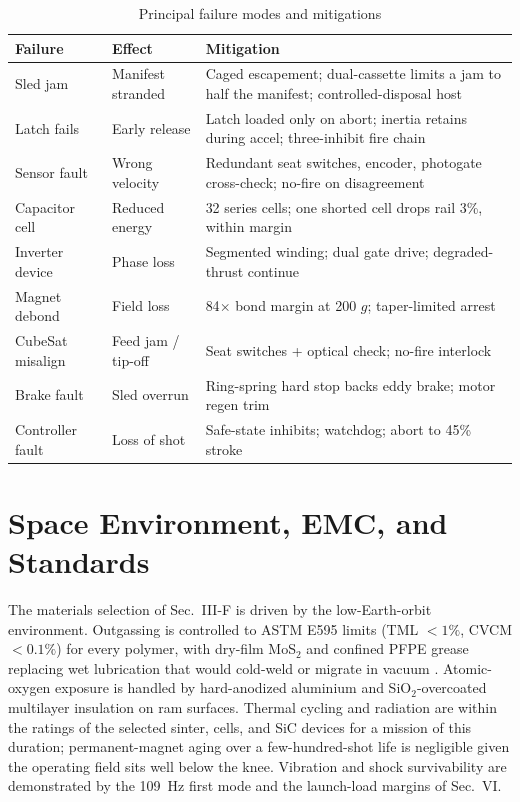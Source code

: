 \documentclass[conference]{IEEEtran}
\begin{document}
\begin{table}[t]
\caption{Principal failure modes and mitigations}
\label{tab:fmea}
\centering\footnotesize
\begin{tabular}{p{1.5cm}p{1.4cm}p{4.2cm}}
\toprule
Failure & Effect & Mitigation\\
\midrule
Sled jam & Manifest stranded & Caged escapement; dual-cassette limits a jam to half the manifest; controlled-disposal host\\
Latch fails & Early release & Latch loaded only on abort; inertia retains during accel; three-inhibit fire chain\\
Sensor fault & Wrong velocity & Redundant seat switches, encoder, photogate cross-check; no-fire on disagreement\\
Capacitor cell & Reduced energy & 32 series cells; one shorted cell drops rail 3\%, within margin\\
Inverter device & Phase loss & Segmented winding; dual gate drive; degraded-thrust continue\\
Magnet debond & Field loss & 84$\times$ bond margin at 200 $g$; taper-limited arrest\\
CubeSat misalign & Feed jam / tip-off & Seat switches + optical check; no-fire interlock\\
Brake fault & Sled overrun & Ring-spring hard stop backs eddy brake; motor regen trim\\
Controller fault & Loss of shot & Safe-state inhibits; watchdog; abort to 45\% stroke\\
\bottomrule
\end{tabular}
\end{table}

\section{Space Environment, EMC, and Standards}\label{sec:env}
The materials selection of Sec.~III-F is driven by the low-Earth-orbit environment. Outgassing is controlled to ASTM E595 limits (TML $<1\%$, CVCM $<0.1\%$) for every polymer, with dry-film MoS$_2$ and confined PFPE grease replacing wet lubrication that would cold-weld or migrate in vacuum \cite{ecss}. Atomic-oxygen exposure is handled by hard-anodized aluminium and SiO$_2$-overcoated multilayer insulation on ram surfaces. Thermal cycling and radiation are within the ratings of the selected sinter, cells, and SiC devices for a mission of this duration; permanent-magnet aging over a few-hundred-shot life is negligible given the operating field sits well below the knee. Vibration and shock survivability are demonstrated by the 109~Hz first mode and the launch-load margins of Sec.~VI.
\end{document}
